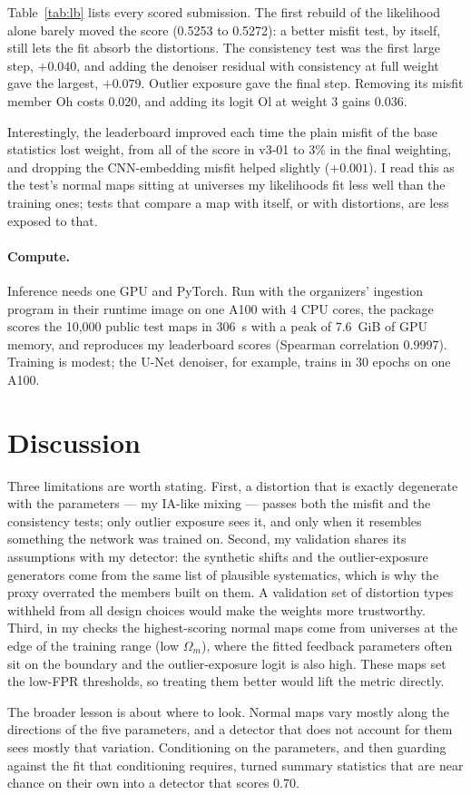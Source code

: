 \documentclass[10pt]{article}
\begin{document}
Table~\ref{tab:lb} lists every scored submission. The first rebuild of the likelihood alone barely moved the score
(0.5253 to 0.5272): a better misfit test, by itself, still lets the fit absorb the distortions. The consistency test
was the first large step, $+0.040$, and adding the denoiser residual with consistency at full weight gave the
largest, $+0.079$. Outlier exposure gave the final step. Removing its misfit member Oh costs 0.020, and adding its
logit Ol at weight 3 gains 0.036.

Interestingly, the leaderboard improved each time the plain misfit of the base statistics lost weight, from all of
the score in v3-01 to 3\% in the final weighting, and dropping the CNN-embedding misfit helped slightly ($+0.001$).
I read this as the test's normal maps sitting at universes my likelihoods fit less well than the training ones;
tests that compare a map with itself, or with distortions, are less exposed to that.

\paragraph{Compute.} Inference needs one GPU and PyTorch. Run with the organizers' ingestion program in their
runtime image on one A100 with 4 CPU cores, the package scores the 10,000 public test maps in 306~s with a peak of
7.6~GiB of GPU memory, and reproduces my leaderboard scores (Spearman correlation 0.9997). Training is modest; the
U-Net denoiser, for example, trains in 30 epochs on one A100.

\section{Discussion}

Three limitations are worth stating. First, a distortion that is exactly degenerate with the parameters --- my
IA-like mixing --- passes both the misfit and the consistency tests; only outlier exposure sees it, and only when it
resembles something the network was trained on. Second, my validation shares its assumptions with my detector:
the synthetic shifts and the outlier-exposure generators come from the same list of plausible systematics, which is
why the proxy overrated the members built on them. A validation set of distortion types withheld from all design
choices would make the weights more trustworthy. Third, in my checks the highest-scoring normal maps come from
universes at the edge of the training range (low $\Omega_m$), where the fitted feedback parameters often sit on the
boundary and the outlier-exposure logit is also high. These maps set the low-FPR thresholds, so treating them better
would lift the metric directly.

The broader lesson is about where to look. Normal maps vary mostly along the directions of the five parameters, and
a detector that does not account for them sees mostly that variation. Conditioning on the parameters, and then
guarding against the fit that conditioning requires, turned summary statistics that are near chance on their own
into a detector that scores 0.70.
\end{document}
